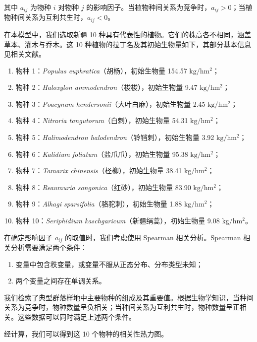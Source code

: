 \documentclass[11pt,a4paper]{ctexart}
\begin{document}
其中 $a_{ij}$ 为物种 $i$ 对物种 $j$ 的影响因子。当植物种间关系为竞争时，$a_{ij}>0$；当植物种间关系为互利共生时，$a_{ij}<0$。

在本模型中，我们选取新疆 10 种具有代表性的植物。它们的株高各不相同，涵盖草本、灌木与乔木。这 10 种植物的拉丁名及其初始生物量如下，其部分基本信息见相关文献\cite{ref6,ref7,ref8,ref9,ref10}。

\begin{enumerate}
\item 物种 1：\textit{Populus euphratica}（胡杨），初始生物量 154.57 $\mathrm{kg/hm^2}$；
\item 物种 2：\textit{Haloxylon ammodendron}（梭梭），初始生物量 9.47 $\mathrm{kg/hm^2}$；
\item 物种 3：\textit{Poacynum hendersonii}（大叶白麻），初始生物量 2.45 $\mathrm{kg/hm^2}$；
\item 物种 4：\textit{Nitraria tangutorum}（白刺），初始生物量 54.31 $\mathrm{kg/hm^2}$；
\item 物种 5：\textit{Halimodendron halodendron}（铃铛刺），初始生物量 3.92 $\mathrm{kg/hm^2}$；
\item 物种 6：\textit{Kalidium foliatum}（盐爪爪），初始生物量 95.38 $\mathrm{kg/hm^2}$；
\item 物种 7：\textit{Tamarix chinensis}（柽柳），初始生物量 38.41 $\mathrm{kg/hm^2}$；
\item 物种 8：\textit{Reaumuria songonica}（红砂），初始生物量 83.90 $\mathrm{kg/hm^2}$；
\item 物种 9：\textit{Alhagi sparsifolia}（骆驼刺），初始生物量 1.88 $\mathrm{kg/hm^2}$；
\item 物种 10：\textit{Seriphidium kaschgaricum}（新疆绢蒿），初始生物量 9.08 $\mathrm{kg/hm^2}$。
\end{enumerate}

在确定影响因子 $a_{ij}$ 的取值时，我们考虑使用 Spearman 相关分析。Spearman 相关分析需要满足两个条件：

\begin{enumerate}
\item 变量中包含秩变量，或变量不服从正态分布、分布类型未知；
\item 两个变量之间存在单调关系。
\end{enumerate}

我们检索了典型群落样地中主要物种的组成及其重要值\cite{ref11}。根据生物学知识，当种间关系为竞争时，物种数量呈负相关；当种间关系为互利共生时，物种数量呈正相关。这些数据可以同时满足上述两个条件。

经计算，我们可以得到这 10 个物种的相关性热力图。
\end{document}
